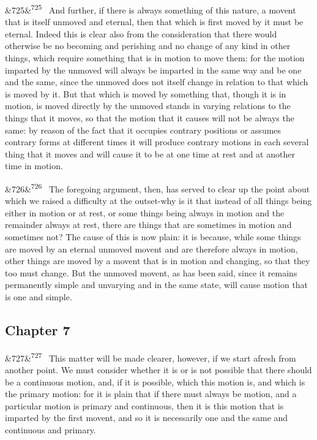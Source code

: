 \documentclass[12pt]{article}
\newcommand{\para}[1][]{\par\noindent\ifx&#1&\else\textsuperscript{\footnotesize #1}~\fi}
\begin{document}
\para[725] And further, if there is always something of this nature, a movent that is itself unmoved and eternal, then that which is first moved by it must be eternal. Indeed this is clear also from the consideration that there would otherwise be no becoming and perishing and no change of any kind in other things, which require something that is in motion to move them: for the motion imparted by the unmoved will always be imparted in the same way and be one and the same, since the unmoved does not itself change in relation to that which is moved by it. But that which is moved by something that, though it is in motion, is moved directly by the unmoved stands in varying relations to the things that it moves, so that the motion that it causes will not be always the same: by reason of the fact that it occupies contrary positions or assumes contrary forms at different times it will produce contrary motions in each several thing that it moves and will cause it to be at one time at rest and at another time in motion.

\para[726] The foregoing argument, then, has served to clear up the point about which we raised a difficulty at the outset-why is it that instead of all things being either in motion or at rest, or some things being always in motion and the remainder always at rest, there are things that are sometimes in motion and sometimes not? The cause of this is now plain: it is because, while some things are moved by an eternal unmoved movent and are therefore always in motion, other things are moved by a movent that is in motion and changing, so that they too must change. But the unmoved movent, as has been said, since it remains permanently simple and unvarying and in the same state, will cause motion that is one and simple.

\subsection*{Chapter 7}

\para[727] This matter will be made clearer, however, if we start afresh from another point. We must consider whether it is or is not possible that there should be a continuous motion, and, if it is possible, which this motion is, and which is the primary motion: for it is plain that if there must always be motion, and a particular motion is primary and continuous, then it is this motion that is imparted by the first movent, and so it is necessarily one and the same and continuous and primary.
\end{document}
